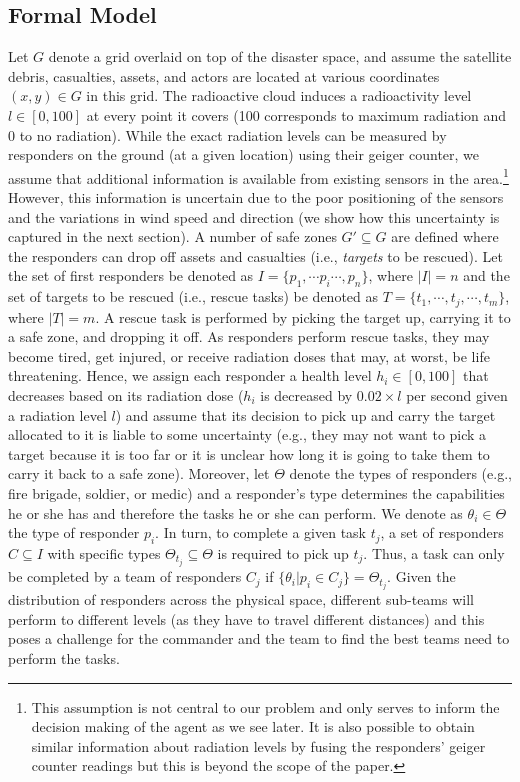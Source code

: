 \subsection{Formal Model}
\noindent Let $G$ denote a grid overlaid on top of the disaster space, and assume the satellite debris, casualties, assets, and actors are located at various coordinates $(x,y) \in G$ in this grid. The radioactive cloud induces a radioactivity level  $l \in [0,100]$ at every point it covers (100 corresponds to maximum radiation and 0 to no radiation). While the exact radiation levels can be measured by responders on the ground (at a given location) using their geiger counter, we assume that additional information is available  from existing sensors  in the area.\footnote{This assumption is not central to our problem and only serves to inform the decision making of the agent as we see later. It is also possible to obtain similar information about radiation levels by fusing the responders' geiger counter readings but this is beyond the scope of the paper.} However, this information is uncertain due to the poor positioning of the sensors and the variations in wind speed and direction (we show how this uncertainty is captured in the next section). A number of safe zones $G' \subseteq G$ are defined where the responders can drop off assets and casualties (i.e., \emph{targets} to be rescued). Let the set of first responders be denoted as $I = \{p_1, \cdots p_i \cdots, p_n\}$, where $|I| = n$ and the set of  targets to be rescued (i.e., rescue tasks) be denoted as  $T = \{t_1,\cdots, t_j, \cdots, t_m\}$, where $|T| = m$. A rescue task is performed by picking the target up, carrying it to a safe zone, and dropping it off.  As responders perform rescue tasks, they may become tired, get injured, or receive radiation doses that may, at worst, be life threatening. Hence, we assign each responder  a health level $h_i\in [0,100]$ that decreases based on its radiation dose ($h_i$ is decreased by $0.02 \times l$ per second given a radiation level $l$) and assume that its decision to pick up and carry the target allocated to it is liable to some uncertainty (e.g., they may not want to pick a target because it is too far or it is unclear how long it is going to take them to  carry it back  to a safe zone).  Moreover, let $\Theta$ denote the types of responders (e.g., fire brigade, soldier, or medic)  and a responder's type determines the capabilities he or she has and therefore the tasks he or she can perform. We denote as $\theta_i \in \Theta$ the type of responder $p_i$. In turn, to complete a given task $t_j$,  a set of responders $C \subseteq I$ with specific types $\Theta_{t_j} \subseteq \Theta$ is required to pick up $t_j$. Thus, a task can only be completed by a team of responders $C_j$ if $\{\theta_i | p_i \in C_j\} = \Theta_{t_j}$. Given the distribution of responders across the physical space, different sub-teams will perform to different levels (as they have to travel different distances) and this poses a challenge for the commander and the team to find the best teams need to perform the tasks.
